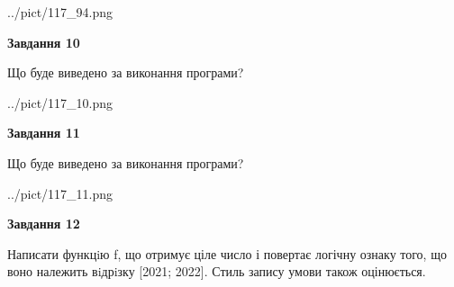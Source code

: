 \documentclass[12pt, ukrainian]{article}
\begin{document}
{\begin {large}
\begin{center}
	{../pict/117_94.png}
\end{center}
\newpage

{\begin {center}\textbf{Завдання 10}\end {center}}

Що буде виведено за виконання програми?\par
\begin{center}
	{../pict/117_10.png}
\end{center}
\newpage

{\begin {center}\textbf{Завдання 11}\end {center}}

Що буде виведено за виконання програми?\par
\begin{center}
	{../pict/117_11.png}
\end{center}
\newpage

{\begin {center}\textbf{Завдання 12}\end {center}}


Написати функцiю f, що отримує ціле число і повертає логічну ознаку того, що воно належить вiдрiзку [2021; 2022]. Стиль запису умови також оцінюється.\par
\newpage

\end {large}}
\end{document}
